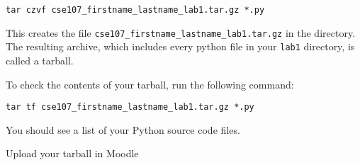 \documentclass[12pt]{article}
\begin{document}
\begin{lstlisting}[style=bash]
tar czvf cse107_firstname_lastname_lab1.tar.gz *.py
\end{lstlisting}

This creates the file \texttt{cse107\_firstname\_lastname\_lab1.tar.gz} in the directory. The resulting archive, which includes every python file in your \texttt{lab1} directory, is called a tarball. 

To check the contents of your tarball, run the following command:

\begin{lstlisting}[style=bash]
tar tf cse107_firstname_lastname_lab1.tar.gz *.py
\end{lstlisting}

You should see a list of your Python source code files.

Upload your tarball in Moodle
\end{document}
